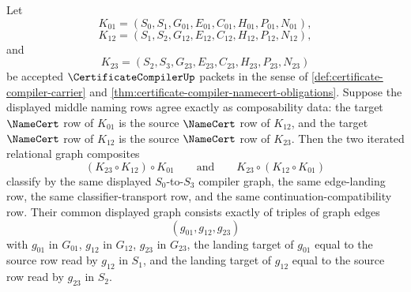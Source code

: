 \begin{theorem}\label{thm:certificate-compiler-triple-composite-associativity}
Let
$$
K_{01}=(S_0,S_1,G_{01},E_{01},C_{01},H_{01},P_{01},N_{01}),
$$
$$
K_{12}=(S_1,S_2,G_{12},E_{12},C_{12},H_{12},P_{12},N_{12}),
$$
and
$$
K_{23}=(S_2,S_3,G_{23},E_{23},C_{23},H_{23},P_{23},N_{23})
$$
be accepted $\CertificateCompilerUp$ packets in the sense of
\autoref{def:certificate-compiler-carrier} and
\autoref{thm:certificate-compiler-namecert-obligations}. Suppose the displayed
middle naming rows agree exactly as composability data: the target
$\NameCert$ row of $K_{01}$ is the source $\NameCert$ row of $K_{12}$, and
the target $\NameCert$ row of $K_{12}$ is the source $\NameCert$ row of
$K_{23}$. Then the two iterated relational graph composites
$$
(K_{23}\circ K_{12})\circ K_{01}
\qquad\text{and}\qquad
K_{23}\circ (K_{12}\circ K_{01})
$$
classify by the same displayed $S_0$-to-$S_3$ compiler graph, the same
edge-landing row, the same classifier-transport row, and the same
continuation-compatibility row. Their common displayed graph consists exactly
of triples of graph edges
$$
(g_{01},g_{12},g_{23})
$$
with $g_{01}$ in $G_{01}$, $g_{12}$ in $G_{12}$, $g_{23}$ in $G_{23}$, the
landing target of $g_{01}$ equal to the source row read by $g_{12}$ in $S_1$,
and the landing target of $g_{12}$ equal to the source row read by $g_{23}$ in
$S_2$.
\end{theorem}
